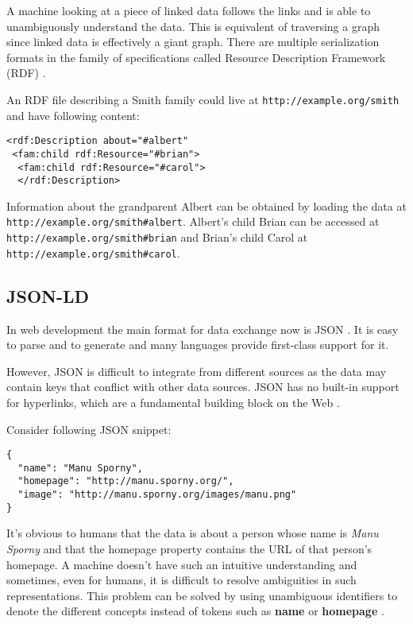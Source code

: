 A machine looking at a piece of linked data follows the links and is able to unambiguously understand the data. This is equivalent of traversing a graph since linked data is effectively a giant graph. There are multiple serialization formats in the family of specifications called Resource Description Framework (RDF) \citep{rdfspecification}.

An RDF file describing a Smith family could live at \lstinline{http://example.org/smith} and have following content:

\lstset{language=XML}
\begin{lstlisting}[caption= Simple example of a person as RDF, label=rdfexample]
<rdf:Description about="#albert"
 <fam:child rdf:Resource="#brian">
  <fam:child rdf:Resource="#carol">
  </rdf:Description>
\end{lstlisting}

Information about the grandparent Albert can be obtained by loading the data at \\ \lstinline{http://example.org/smith#albert}. Albert's child Brian can be accessed at \\  \lstinline{http://example.org/smith#brian} and Brian's child Carol at \lstinline{http://example.org/smith#carol}.

\subsection{JSON-LD}\label{jsonld}

In web development the main format for data exchange now is JSON \citep{jsonformat}. It is easy to parse and to generate and many languages provide first-class support for it.

However, JSON is difficult to integrate from different sources as the data may contain keys that conflict with other data sources. JSON has no built-in support for hyperlinks, which are a fundamental building block on the Web \citep{jsonldbasicconcepts}.

Consider following JSON snippet:

\lstset{language=JSON}
\begin{lstlisting}[caption=Data of a person in the JSON format, label=jsonexample]
{
  "name": "Manu Sporny",
  "homepage": "http://manu.sporny.org/",
  "image": "http://manu.sporny.org/images/manu.png"
}
\end{lstlisting}

It's obvious to humans that the data is about a person whose name is \textit{Manu Sporny} and that the homepage property contains the URL of that person's homepage. A machine doesn't have such an intuitive understanding and sometimes, even for humans, it is difficult to resolve ambiguities in such representations. This problem can be solved by using unambiguous identifiers to denote the different concepts instead of tokens such as \textbf{name} or \textbf{homepage} \citep{jsonldbasicconcepts}.

